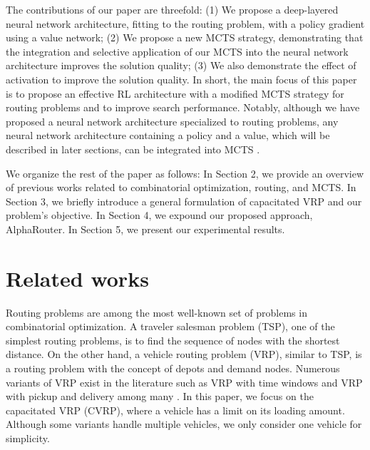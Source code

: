 \documentclass{article}
\begin{document}
The contributions of our paper are threefold: (1) We propose a deep-layered neural network architecture, fitting to the routing problem, with a policy gradient using a value network; (2) We propose a new MCTS strategy, demonstrating that the integration and selective application of our MCTS into the neural network architecture improves the solution quality; (3) We also demonstrate the effect of activation to improve the solution quality.
In short, the main focus of this paper is to propose an effective RL architecture with a modified MCTS strategy for routing problems and to improve search performance. Notably, although we have proposed a neural network architecture specialized to routing problems, any neural network architecture containing a policy and a value, which will be described in later sections, can be integrated into MCTS \cite{schrittwieser2020mastering}.

We organize the rest of the paper as follows: In Section 2, we provide an overview of previous works related to combinatorial optimization, routing, and MCTS. In Section 3, we briefly introduce a general formulation of capacitated VRP and our problem's objective. In Section 4, we expound our proposed approach, AlphaRouter. In Section 5, we present our experimental results.

\section{Related works}


Routing problems are among the most well-known set of problems in combinatorial optimization. A traveler salesman problem (TSP), one of the simplest routing problems, is to find the sequence of nodes with the shortest distance. On the other hand, a vehicle routing problem (VRP), similar to TSP, is a routing problem with the concept of depots and demand nodes. Numerous variants of VRP exist in the literature such as VRP with time windows and VRP with pickup and delivery among many \cite{kumarSurveyVehicleRouting2012}. In this paper, we focus on the capacitated VRP (CVRP), where a vehicle has a limit on its loading amount. Although some variants handle multiple vehicles, we only consider one vehicle for simplicity.
\end{document}
